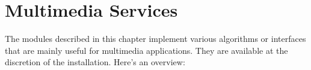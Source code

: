 \chapter{Multimedia Services}
\label{mmedia}

The modules described in this chapter implement various algorithms or
interfaces that are mainly useful for multimedia applications.  They
are available at the discretion of the installation.  Here's an overview:

\localmoduletable
